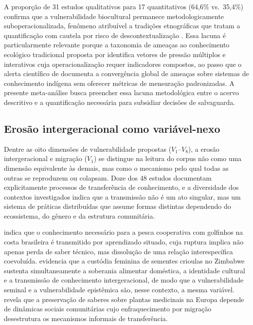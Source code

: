 A proporção de 31 estudos qualitativos para 17 quantitativos (64,6\% vs.\ 35,4\%) confirma que a vulnerabilidade biocultural permanece metodologicamente suboperacionalizada, fenômeno atribuível a tradições etnográficas que tratam a quantificação com cautela por risco de descontextualização \cite{Agrawal2002}. Essa lacuna é particularmente relevante porque a taxonomia de ameaças ao conhecimento ecológico tradicional proposta por  identifica vetores de pressão múltiplos e interativos cuja operacionalização requer indicadores compostos, ao passo que o alerta científico de  documenta a convergência global de ameaças sobre sistemas de conhecimento indígena sem oferecer métricas de mensuração padronizadas. A presente meta-análise busca preencher essa lacuna metodológica entre o acervo descritivo e a quantificação necessária para subsidiar decisões de salvaguarda.

\subsection{Erosão intergeracional como variável-nexo}
\label{sec:dimensional-coverage_cap2}

Dentre as oito dimensões de vulnerabilidade propostas ($V_1$--$V_8$), a erosão intergeracional e migração ($V_1$) se distingue na leitura do corpus não como uma dimensão equivalente às demais, mas como o mecanismo pelo qual todas as outras se reproduzem ou colapsam. Doze dos 48 estudos documentam explicitamente processos de transferência de conhecimento, e a diversidade dos contextos investigados indica que a transmissão não é um ato singular, mas um sistema de práticas distribuídas que assume formas distintas dependendo do ecossistema, do gênero e da estrutura comunitária.

 indica que o conhecimento necessário para a pesca cooperativa com golfinhos na costa brasileira é transmitido por aprendizado situado, cuja ruptura implica não apenas perda de saber técnico, mas dissolução de uma relação interespecífica coevoluída.  evidencia que a custódia feminina de sementes crioulas no Zimbabwe sustenta simultaneamente a soberania alimentar doméstica, a identidade cultural e a transmissão de conhecimento intergeracional, de modo que a vulnerabilidade seminal e a vulnerabilidade epistêmica são, nesse contexto, a mesma variável.  revela que a preservação de saberes sobre plantas medicinais na Europa depende de dinâmicas sociais comunitárias cujo enfraquecimento por migração desestrutura os mecanismos informais de transferência.

